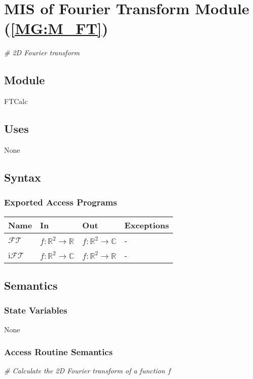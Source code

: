 \documentclass[12pt, titlepage]{article}
\begin{document}
\section{MIS of Fourier Transform Module (\texorpdfstring{\cref{MG:M_FT}}))} \label{MIS_FT}
\textit{{\#} 2D Fourier transform}
\subsection{Module}
FTCalc
\subsection{Uses}
None
\subsection{Syntax}

\subsubsection{Exported Access Programs}

\begin{center}
\begin{tabular}{p{2cm} p{4cm} p{4cm} p{2cm}}
\hline
\textbf{Name} & \textbf{In} & \textbf{Out} & \textbf{Exceptions} \\
\hline
$\mathcal{FT}$ & $f:\mathbb{R}^2\rightarrow\mathbb{R}$ & $f:\mathbb{R}^2\rightarrow\mathbb{C}$ & - \\
i$\mathcal{FT}$ & $f:\mathbb{R}^2\rightarrow\mathbb{C}$ & $f:\mathbb{R}^2\rightarrow\mathbb{R}$ & - \\
\hline
\end{tabular}
\end{center}

\subsection{Semantics}

\subsubsection{State Variables}
None

\subsubsection{Access Routine Semantics}

\noindent\textit{{\#} Calculate the 2D Fourier transform of a function $f$} \medskip
\end{document}
